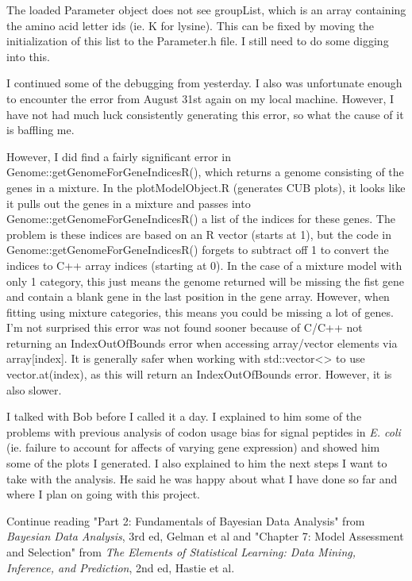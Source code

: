 \documentclass[11pt]{labbook}
\begin{document}
The loaded Parameter object does not see groupList, which is an array containing the amino acid letter ids (ie. K for lysine). This can be fixed by moving the initialization of this list to the Parameter.h file. I still need to do some digging into this.

I continued some of the debugging from yesterday. I also was unfortunate enough to encounter the error from August 31st again on my local machine. However, I have not had much luck consistently generating this error, so what the cause of it is baffling me. 

However, I did find a fairly significant error in  Genome::getGenomeForGeneIndicesR(), which returns a genome consisting of the genes in a mixture. In the plotModelObject.R (generates CUB plots), it looks like it pulls out the genes in a mixture and passes into Genome::getGenomeForGeneIndicesR() a list of the indices for these genes. The problem is these indices are based on an R vector (starts at 1), but the code in Genome::getGenomeForGeneIndicesR() forgets to subtract off 1 to convert the indices to C++ array indices (starting at 0). In the case of a mixture model with only 1 category, this just means the genome returned will be missing the fist gene and contain a blank gene in the last position in the gene array. However, when fitting using mixture categories, this means you could be missing a lot of genes. I'm not surprised this error was not found sooner because of C/C++ not returning an IndexOutOfBounds error when accessing array/vector elements via array[index]. It is generally safer when working with std::vector<> to use vector.at(index), as this will return an IndexOutOfBounds error. However, it is also slower. 

I talked with Bob before I called it a day. I explained to him some of the problems with previous analysis of codon usage bias for signal peptides in \textit{E. coli} (ie. failure to account for affects of varying gene expression) and showed him some of the plots I generated. I also explained to him the next steps I want to take with the analysis. He said he was happy about what I have done so far and where I plan on going with this project.

Continue reading "Part 2: Fundamentals of Bayesian Data Analysis" from \textit{Bayesian Data Analysis}, 3rd ed, Gelman et al and "Chapter 7: Model Assessment and Selection" from \textit{The Elements of Statistical Learning: Data Mining, Inference, and Prediction}, 2nd ed, Hastie et al.
\end{document}
